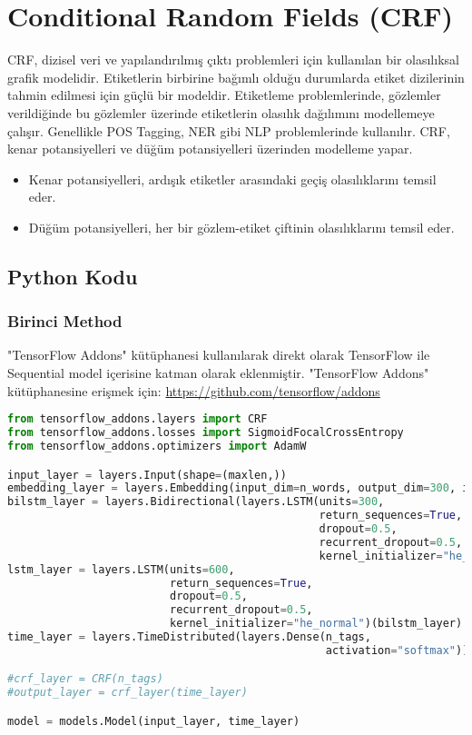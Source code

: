 \section{Conditional Random Fields (CRF)}
CRF, dizisel veri ve yapılandırılmış çıktı problemleri için kullanılan bir olasılıksal grafik modelidir. Etiketlerin birbirine bağımlı olduğu durumlarda etiket dizilerinin tahmin edilmesi için güçlü bir modeldir. Etiketleme problemlerinde, gözlemler verildiğinde bu gözlemler üzerinde etiketlerin olasılık dağılımını modellemeye çalışır. Genellikle POS Tagging, NER gibi NLP problemlerinde kullanılır. CRF, kenar potansiyelleri ve düğüm potansiyelleri üzerinden modelleme yapar.
\begin{itemize}
	\item Kenar potansiyelleri, ardışık etiketler arasındaki geçiş olasılıklarını temsil eder.
	\item Düğüm potansiyelleri, her bir gözlem-etiket çiftinin olasılıklarını temsil eder.
\end{itemize}

\subsection{Python Kodu}

\subsubsection{Birinci Method}

"TensorFlow Addons" kütüphanesi kullanılarak direkt olarak TensorFlow ile Sequential model içerisine katman olarak eklenmiştir. "TensorFlow Addons" kütüphanesine erişmek için: \url{https://github.com/tensorflow/addons}

\begin{lstlisting}[language=Python]
from tensorflow_addons.layers import CRF
from tensorflow_addons.losses import SigmoidFocalCrossEntropy
from tensorflow_addons.optimizers import AdamW

input_layer = layers.Input(shape=(maxlen,))
embedding_layer = layers.Embedding(input_dim=n_words, output_dim=300, input_length=maxlen)(input_layer)
bilstm_layer = layers.Bidirectional(layers.LSTM(units=300,
                                                return_sequences=True,
                                                dropout=0.5,
                                                recurrent_dropout=0.5,
                                                kernel_initializer="he_normal"))(embedding_layer)
lstm_layer = layers.LSTM(units=600,
                         return_sequences=True,
                         dropout=0.5,
                         recurrent_dropout=0.5,
                         kernel_initializer="he_normal")(bilstm_layer)
time_layer = layers.TimeDistributed(layers.Dense(n_tags,
                                                 activation="softmax"))(lstm_layer)

#crf_layer = CRF(n_tags)
#output_layer = crf_layer(time_layer)

model = models.Model(input_layer, time_layer)
\end{lstlisting}

